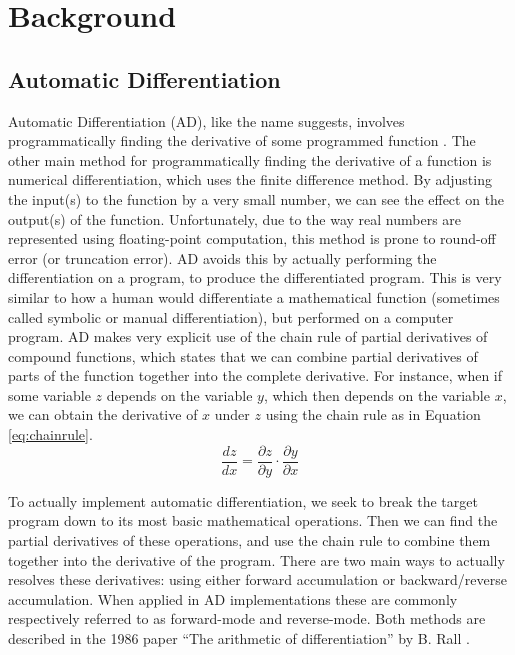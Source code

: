 \section{Background}
    \subsection{Automatic Differentiation}
        Automatic Differentiation (AD), like the name suggests, involves programmatically finding the derivative of some programmed function \cite{margossian2019review}.
        The other main method for programmatically finding the derivative of a function is numerical differentiation, which uses the finite difference method.
        By adjusting the input(s) to the function by a very small number, we can see the effect on the output(s) of the function.
        Unfortunately, due to the way real numbers are represented using floating-point computation, this method is prone to round-off error (or truncation error).
        AD avoids this by actually performing the differentiation on a program, to produce the differentiated program.
        This is very similar to how a human would differentiate a mathematical function (sometimes called symbolic or manual differentiation), but performed on a computer program.
        AD makes very explicit use of the chain rule of partial derivatives of compound functions, which states that we can combine partial derivatives of parts of the function together into the complete derivative.
        For instance, when if some variable $z$ depends on the variable $y$, which then depends on the variable $x$, we can obtain the derivative of $x$ under $z$ using the chain rule as in Equation \ref{eq:chainrule}.
        \begin{equation} \label{eq:chainrule}
            \frac{dz}{dx}=\frac{\partial z}{\partial y}\cdot\frac{\partial y}{\partial x}
        \end{equation}

        To actually implement automatic differentiation, we seek to break the target program down to its most basic mathematical operations.
        Then we can find the partial derivatives of these operations, and use the chain rule to combine them together into the derivative of the program.
        There are two main ways to actually resolves these derivatives: using either forward accumulation or backward/reverse accumulation.
        When applied in AD implementations these are commonly respectively referred to as forward-mode and reverse-mode.
        Both methods are described in the 1986 paper ``The arithmetic of differentiation'' by B. Rall \cite{rall1986arithmetic}.
        
